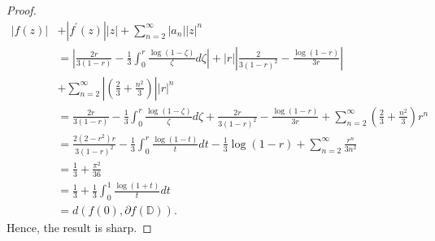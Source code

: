 \documentclass[10pt,a4paper]{amsart}
\begin{document}
\begin{proof}
\begin{align*}
|f(z)|& + |f^{'}(z)||z| + \sum_{n=2}^{\infty} |a_n| |z|^n\\
&= \left|\frac{2r}{3(1-r)} - \frac{1}{3} \int_{0}^{r} \frac{\log(1-\zeta)}{\zeta} d\zeta \right| + |r| \left| \frac{2}{3(1-r)^2}-\frac{\log(1-r)}{3r} \right|\\
  &+   \sum_{n=2}^{\infty} \left| \left( \frac{2}{3}+ \frac{n^2}{3}\right) \right| |r|^n\\
&= \frac{2r}{3(1-r)} - \frac{1}{3} \int_{0}^{r} \frac{\log(1-\zeta)}{\zeta} d\zeta  +   \frac{2r}{3(1-r)^2}-\frac{\log(1-r)}{3r}  +   \sum_{n=2}^{\infty}  \left( \frac{2}{3}+ \frac{n^2}{3}\right) r^n\\
&=\frac{2 (2-r^2) r}{3 (1-r)^2}-\frac{1}{3} \int_{0}^{r} \frac{\log(1-t)}{t} dt-\frac{1}{3} \log(1-r)+ \sum_{n=2}^{\infty} \frac{r^n}{3 n^2}\\
&=\frac{1}{3}+\frac{\pi ^2}{36}\\
&=\frac{1}{3} +\frac{1}{3} \int_{0}^{1} \frac{\log(1+t)}{t} dt\\
&=d(f(0), \partial{f(\mathbb{D})}).
\end{align*}
Hence, the result is sharp.
\end{proof}
\end{document}

